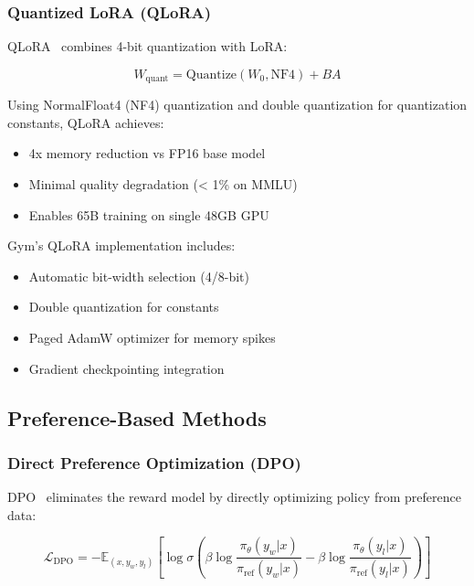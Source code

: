 \subsubsection{Quantized LoRA (QLoRA)}

QLoRA~\citep{dettmers2023qlora} combines 4-bit quantization with LoRA:

\begin{equation}
W_{\text{quant}} = \text{Quantize}(W_0, \text{NF4}) + BA
\end{equation}

Using NormalFloat4 (NF4) quantization and double quantization for quantization constants, QLoRA achieves:
\begin{itemize}
\item 4x memory reduction vs FP16 base model
\item Minimal quality degradation (< 1\% on MMLU)
\item Enables 65B training on single 48GB GPU
\end{itemize}

Gym's QLoRA implementation includes:
\begin{itemize}
\item Automatic bit-width selection (4/8-bit)
\item Double quantization for constants
\item Paged AdamW optimizer for memory spikes
\item Gradient checkpointing integration
\end{itemize}

\subsection{Preference-Based Methods}

\subsubsection{Direct Preference Optimization (DPO)}

DPO~\citep{rafailov2023dpo} eliminates the reward model by directly optimizing policy from preference data:

\begin{equation}
\mathcal{L}_{\text{DPO}} = -\mathbb{E}_{(x, y_w, y_l)} \left[ \log \sigma \left( \beta \log \frac{\pi_\theta(y_w|x)}{\pi_{\text{ref}}(y_w|x)} - \beta \log \frac{\pi_\theta(y_l|x)}{\pi_{\text{ref}}(y_l|x)} \right) \right]
\end{equation}

